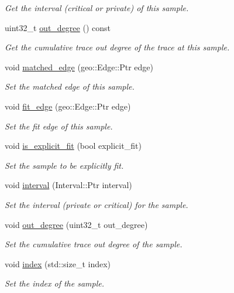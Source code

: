 \begin{DoxyCompactItemize}
\begin{DoxyCompactList}\small\item\em Get the interval (critical or private) of this sample. \end{DoxyCompactList}\item 
uint32\+\_\+t \hyperlink{classgeo__data_1_1Sample_aee00b5ede8ede7cb8119c4a94f85fe8e}{out\+\_\+degree} () const 
\begin{DoxyCompactList}\small\item\em Get the cumulative trace out degree of the trace at this sample. \end{DoxyCompactList}\item 
void \hyperlink{classgeo__data_1_1Sample_a9e2a4ac09187e72f582122253531c669}{matched\+\_\+edge} (geo\+::\+Edge\+::\+Ptr edge)
\begin{DoxyCompactList}\small\item\em Set the matched edge of this sample. \end{DoxyCompactList}\item 
void \hyperlink{classgeo__data_1_1Sample_ad968e18e8b77a4325e1245f2333d802e}{fit\+\_\+edge} (geo\+::\+Edge\+::\+Ptr edge)
\begin{DoxyCompactList}\small\item\em Set the fit edge of this sample. \end{DoxyCompactList}\item 
void \hyperlink{classgeo__data_1_1Sample_abc387126ac2a9285599aa7b4d243cdb5}{is\+\_\+explicit\+\_\+fit} (bool explicit\+\_\+fit)
\begin{DoxyCompactList}\small\item\em Set the sample to be explicitly fit. \end{DoxyCompactList}\item 
void \hyperlink{classgeo__data_1_1Sample_a7c69af72f22c276d96ac9b17d5a5b250}{interval} (Interval\+::\+Ptr interval)
\begin{DoxyCompactList}\small\item\em Set the interval (private or critical) for the sample. \end{DoxyCompactList}\item 
void \hyperlink{classgeo__data_1_1Sample_ad339548ab91c90be41c9be2c81d3d07a}{out\+\_\+degree} (uint32\+\_\+t out\+\_\+degree)
\begin{DoxyCompactList}\small\item\em Set the cumulative trace out degree of the sample. \end{DoxyCompactList}\item 
void \hyperlink{classgeo__data_1_1Sample_af432c7b67cb2280eaac5d0d8c24163bf}{index} (std\+::size\+\_\+t index)
\begin{DoxyCompactList}\small\item\em Set the index of the sample. \end{DoxyCompactList}\end{DoxyCompactItemize}
